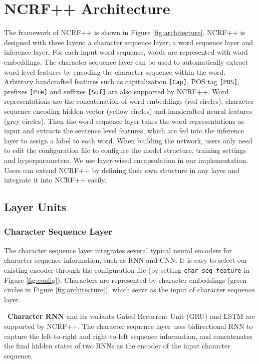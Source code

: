 \documentclass[11pt,a4paper]{article}
\begin{document}
\section{NCRF++ Architecture}
The framework of NCRF++ is shown in Figure \ref{fig:architecture}. NCRF++ is designed with three layers: a character sequence layer; a word sequence layer and inference layer. For each input word sequence, words are represented with word embeddings. The character sequence layer can be used to automatically extract word level features by encoding the character sequence within the word. Arbitrary handcrafted features such as capitalization \texttt{[Cap]}, POS tag \texttt{[POS]}, prefixes \texttt{[Pre]} and suffixes \texttt{[Suf]} are also supported by NCRF++. Word representations are the concatenation of word embeddings (red circles), character sequence encoding hidden vector (yellow circles) and handcrafted neural features (grey circles). Then the word sequence layer takes the word representations as input and extracts the sentence level features, which are fed into the inference layer to assign a label to each word. When building the network, users only need to edit the configuration file to configure the model structure, training settings and hyperparameters. We use layer-wised encapsulation in our implementation. Users can extend NCRF++ by defining their own structure in any layer and integrate it into NCRF++ easily.

\subsection{Layer Units} \label{ssec:layers}
\subsubsection{Character Sequence Layer}
The character sequence layer integrates several typical neural encoders for character sequence information, such as RNN and CNN. It is easy to select our existing encoder through the configuration file (by setting \texttt{char\_seq\_feature} in Figure \ref{fig:config}). Characters are represented by character embeddings (green circles in Figure \ref{fig:architecture}), which serve as the input of character sequence layer.

\noindent \textbullet $\,$ \textbf{Character RNN} and its variants Gated Recurrent Unit (GRU) and LSTM are supported by NCRF++. The character sequence layer uses bidirectional RNN to capture the left-to-right and right-to-left sequence information, and concatenates the final hidden states of two RNNs as the encoder of the input character sequence.
\end{document}
